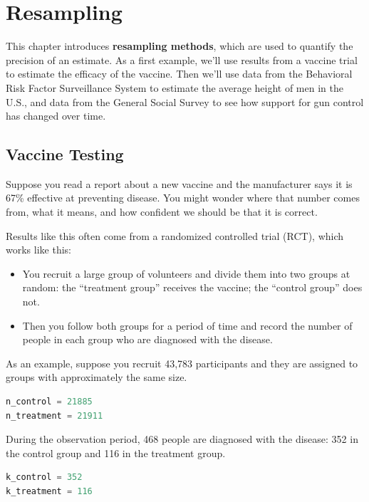 \hypertarget{resampling}{%
\chapter{Resampling}\label{resampling}}

This chapter introduces \textbf{resampling methods}, which are used to
quantify the precision of an estimate. As a first example, we'll use
results from a vaccine trial to estimate the efficacy of the vaccine.
Then we'll use data from the Behavioral Risk Factor Surveillance System
to estimate the average height of men in the U.S., and data from the
General Social Survey to see how support for gun control has changed
over time.

\hypertarget{vaccine-testing}{%
\section{Vaccine Testing}\label{vaccine-testing}}

Suppose you read a report about a new vaccine and the manufacturer says
it is 67\% effective at preventing disease. You might wonder where that
number comes from, what it means, and how confident we should be that it
is correct.

Results like this often come from a randomized controlled trial (RCT),
which works like this:

\begin{itemize}
\item
  You recruit a large group of volunteers and divide them into two
  groups at random: the ``treatment group'' receives the vaccine; the
  ``control group'' does not.
\item
  Then you follow both groups for a period of time and record the number
  of people in each group who are diagnosed with the disease.
\end{itemize}

As an example, suppose you recruit 43,783 participants and they are
assigned to groups with approximately the same size.

\begin{lstlisting}[language=Python,style=source]
n_control = 21885
n_treatment = 21911
\end{lstlisting}

During the observation period, 468 people are diagnosed with the
disease: 352 in the control group and 116 in the treatment group.

\begin{lstlisting}[language=Python,style=source]
k_control = 352
k_treatment = 116
\end{lstlisting}

